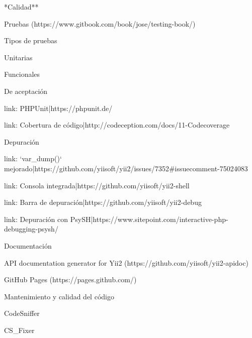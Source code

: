 \begin{longenum}
\begin{longenum}
\begin{longenum}
        \end{longenum}
    \end{longenum}
    \item **Calidad**
    \begin{longenum}
        \item [Pruebas](https://www.gitbook.com/book/jose/testing-book/)
        \begin{longenum}
            \item Tipos de pruebas
            \begin{longenum}
                \item Unitarias
                \item Funcionales
                \item De aceptación
            \end{longenum}
            \item [link: PHPUnit|https://phpunit.de/]
            \item [link: Cobertura de código|http://codeception.com/docs/11-Codecoverage]
        \end{longenum}
        \item Depuración
        \begin{longenum}
            \item [link: `var_dump()` mejorado|https://github.com/yiisoft/yii2/issues/7352#issuecomment-75024083]
            \item [link: Consola integrada|https://github.com/yiisoft/yii2-shell]
            \item [link: Barra de depuración|https://github.com/yiisoft/yii2-debug]
            \item [link: Depuración con PsySH|https://www.sitepoint.com/interactive-php-debugging-psysh/]
        \end{longenum}
        \item Documentación
        \begin{longenum}
            \item [API documentation generator for Yii2](https://github.com/yiisoft/yii2-apidoc)
            \item [GitHub Pages](https://pages.github.com/)
        \end{longenum}
        \item Mantenimiento y calidad del código
        \begin{longenum}
            \item CodeSniffer
            \item CS_Fixer

\end{longenum}
\end{longenum}
\end{longenum}
